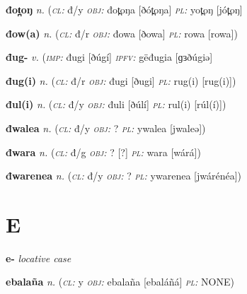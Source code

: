 \newentry
\headword\textbf{đot̪oŋ}  
\ipa{[ðót̪oŋ]}
\synpos\textit{n.} 
\class(\textit{\textsc{cl:}} {đ/y}
\object\textit{\textsc{obj:}} đot̪oŋa [ðót̪oŋa]
\plural\textit{\textsc{pl:}} yot̪oŋ [jót̪oŋ]


\newentry
\headword\textbf{đow(a)}  
\ipa{[ðow(a)]}
\synpos\textit{n.} 
\class(\textit{\textsc{cl:}} {đ/r}
\object\textit{\textsc{obj:}} đowa [ðowa]
\plural\textit{\textsc{pl:}} rowa [rowa])

\newentry
\headword\textbf{đug-}  
\ipa{[ðug-]}
\synpos\textit{v.} 
\imperative(\textit {\textsc{imp:}} đugi [ðúgí]
\imperfective\textit {\textsc{ipfv:}} gëđugia [ɡɜðúgiə]

\newentry
\headword\textbf{đug(i)}  
\ipa{[ðug(i)]}
\synpos\textit{n.} 
\class(\textit{\textsc{cl:}} {đ/r}
\object\textit{\textsc{obj:}} đugi [ðugi]
\plural\textit{\textsc{pl:}} rug(i) [rug(i)])

\newentry
\headword\textbf{đul(i)}  
\ipa{[ðúl(í)]}
\synpos\textit{n.} 
\class(\textit{\textsc{cl:}} {đ/y}
\object\textit{\textsc{obj:}} đuli [ðúlí]
\plural\textit{\textsc{pl:}} rul(i) [rúl(í)])


\newentry
\headword\textbf{đwalea}  
\ipa{[ðwaleə]}
\synpos\textit{n.} 
\class(\textit{\textsc{cl:}} {đ/y}
\object\textit{\textsc{obj:}} ? 
\plural\textit{\textsc{pl:}} ywalea [jwaleə])

\newentry
\headword\textbf{đwara}  
\ipa{[ðwárá]}
\synpos\textit{n.} 
\class(\textit{\textsc{cl:}} {đ/g}
\object\textit{\textsc{obj:}} ? [?]
\plural\textit{\textsc{pl:}} wara [wárá])


\newentry
\headword\textbf{đwarenea}  
\ipa{[ðwárénéa]}
\synpos\textit{n.} 
\class(\textit{\textsc{cl:}} {đ/y}
\object\textit{\textsc{obj:}} ? 
\plural\textit{\textsc{pl:}} ywarenea [jwárénéa])


\section*{E}\label{E}

\newentry
\headword\textbf{e-}  
\ipa{[é-]}
\synpos\textit{locative case} 

\newentry
\headword\textbf{ebalaña}  
\ipa{[ebaláɲá]}
\synpos\textit{n.} 
\class(\textit{\textsc{cl:}} {y}
\object\textit{\textsc{obj:}} ebalaña [ebaláñá]
\plural\textit{\textsc{pl:}} NONE)
  
